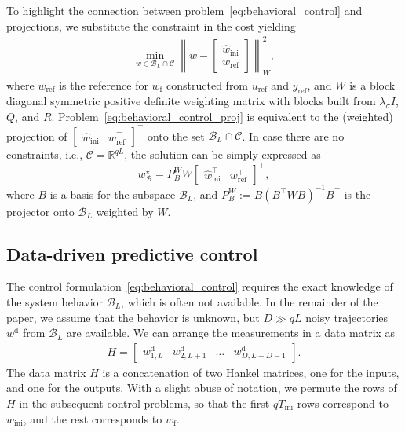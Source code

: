 \documentclass[letterpaper, 10 pt, conference]{ieeeconf}
\begin{document}
To highlight the connection between problem~\eqref{eq:behavioral_control} and projections, we substitute the constraint in the cost yielding
    \begin{align} \label{eq:behavioral_control_proj}
    \min_{w\in \mathcal{B}_L \cap \mathcal{C}} \left \|w - \begin{bmatrix}
    \hat{w}_\mathrm{ini} \\ w_\mathrm{ref}
    \end{bmatrix}\right \|^2_{W},
    \end{align}
where $w_\mathrm{ref}$ is the reference for $w_\mathrm{f}$ constructed from $u_\mathrm{ref}$ and $y_\mathrm{ref}$, and $W$ is a block diagonal symmetric positive definite weighting matrix with blocks built from $\lambda_\sigma I$, $Q$, and $R$.
Problem~\eqref{eq:behavioral_control_proj} is equivalent to the (weighted) projection of $\begin{bmatrix}\hat{w}_\mathrm{ini}^\top & w_\mathrm{ref}^\top\end{bmatrix}^\top$ onto the set $\mathcal{B}_L\cap\mathcal{C}$.
In case there are no constraints, i.e., $\mathcal{C} = \mathbb{R}^{qL}$, the solution can be simply expressed as 
$$w^\star_\mathcal{B} = P_B^W W\begin{bmatrix}\hat{w}_\mathrm{ini}^\top & w_\mathrm{ref}^\top\end{bmatrix}^\top,$$ where $B$ is a basis for the subspace $\mathcal{B}_L$, and
$P_B^W := B(B^\top W B)^{-1} B^\top$ is the projector onto $\mathcal{B}_L$ weighted by $W$.

\subsection{Data-driven predictive control} \label{sec:DeePC_sp}
The control formulation~\eqref{eq:behavioral_control} requires the exact knowledge of the system behavior $\mathcal{B}_L$, which is often not available.
In the remainder of the paper, we assume that the behavior is unknown, but $D \gg qL$ noisy trajectories $w^\mathrm{d}$ from $\mathcal{B}_L$ are available.
We can arrange the measurements in a data matrix as
\begin{align} \label{eq:noisy_data}
     H = \begin{bmatrix}
         w^\mathrm{d}_{1,L} & w^\mathrm{d}_{2,L+1} & \dots & w^\mathrm{d}_{D,L+D-1}
     \end{bmatrix}.
\end{align}
The data matrix $H$ is a concatenation of two Hankel matrices, one for the inputs, and one for the outputs.
With a slight abuse of notation, we permute the rows of $H$ in the subsequent control problems, so that the first $qT_\mathrm{ini}$ rows correspond to $w_\mathrm{ini}$, and the rest corresponds to $w_\mathrm{f}$.
\end{document}
